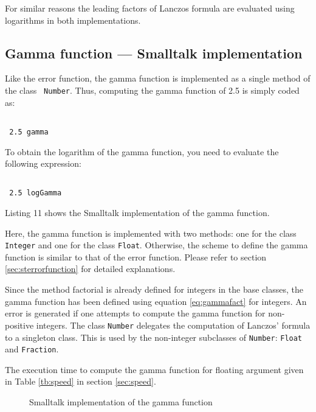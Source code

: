 \documentclass[twoside]{book}
\begin{document}
For similar reasons the leading factors of Lanczos formula are
evaluated using logarithms in both implementations.

\subsection{Gamma function --- Smalltalk implementation}
 Like the error function, the gamma
function is implemented as a single method of the class {\tt
Number}. Thus, computing the gamma function of 2.5 is simply coded
as:
\begin{codeExample}
\begin{verbatim}

 2.5 gamma
\end{verbatim}
\end{codeExample}
To obtain the logarithm of the gamma function, you need to
evaluate the following expression:
\begin{codeExample}
\begin{verbatim}

 2.5 logGamma
\end{verbatim}
\end{codeExample}
Listing 11 shows the Smalltalk implementation of the gamma
function.

Here, the gamma function is implemented with two methods: one for
the class {\tt Integer} and one for the class {\tt Float}.
Otherwise, the scheme to define the gamma function is similar to
that of the error function. Please refer to section
\ref{sec:sterrorfunction} for detailed explanations.

Since the method factorial is already defined for integers in the
base classes, the gamma function has been defined using equation
\ref{eq:gammafact} for integers. An error is generated if one
attempts to compute the gamma function for non-positive integers.
The class {\tt Number} delegates the computation of Lanczos'
formula to a singleton class. This is used by the non-integer
subclasses of {\tt Number}: {\tt Float} and {\tt Fraction}.

The execution time to compute the gamma function for floating
argument given in Table \ref{tb:speed} in section \ref{sec:speed}.
\begin{figure}
\begin{listing}
\caption{Smalltalk implementation of the gamma function}
\label{ls:gammafunc}



\end{listing}
\end{figure}
\end{document}
